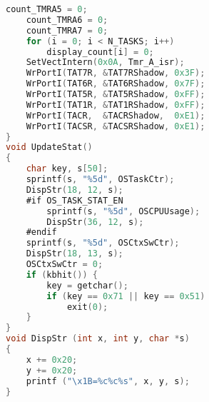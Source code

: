 \begin{lstlisting}[language=C]
    count_TMRA5 = 0;
    count_TMRA6 = 0;
    count_TMRA7 = 0;
    for (i = 0; i < N_TASKS; i++)
        display_count[i] = 0;
    SetVectIntern(0x0A, Tmr_A_isr);
    WrPortI(TAT7R, &TAT7RShadow, 0x3F);
    WrPortI(TAT6R, &TAT6RShadow, 0x7F);
    WrPortI(TAT5R, &TAT5RShadow, 0xFF);
    WrPortI(TAT1R, &TAT1RShadow, 0xFF);
    WrPortI(TACR,  &TACRShadow,  0xE1);
    WrPortI(TACSR, &TACSRShadow, 0xE1);
}
void UpdateStat()
{
    char key, s[50];
    sprintf(s, "%5d", OSTaskCtr);
    DispStr(18, 12, s);
    #if OS_TASK_STAT_EN
        sprintf(s, "%5d", OSCPUUsage);
        DispStr(36, 12, s);
    #endif
    sprintf(s, "%5d", OSCtxSwCtr);
    DispStr(18, 13, s);
    OSCtxSwCtr = 0;
    if (kbhit()) {
        key = getchar();
        if (key == 0x71 || key == 0x51)
            exit(0);
    }
}
void DispStr (int x, int y, char *s)
{
    x += 0x20;
    y += 0x20;
    printf ("\x1B=%c%c%s", x, y, s);
}
\end{lstlisting}